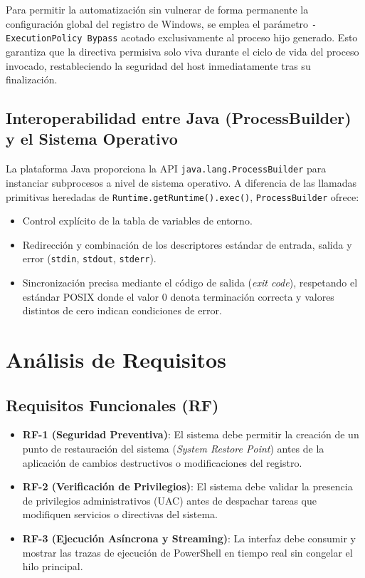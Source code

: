 \documentclass[12pt,a4paper]{report}
\begin{document}
Para permitir la automatización sin vulnerar de forma permanente la configuración global del registro de Windows, se emplea el parámetro \texttt{-ExecutionPolicy Bypass} acotado exclusivamente al proceso hijo generado. Esto garantiza que la directiva permisiva solo viva durante el ciclo de vida del proceso invocado, restableciendo la seguridad del host inmediatamente tras su finalización.

\section{Interoperabilidad entre Java (ProcessBuilder) y el Sistema Operativo}
La plataforma Java proporciona la API \texttt{java.lang.ProcessBuilder} para instanciar subprocesos a nivel de sistema operativo. A diferencia de las llamadas primitivas heredadas de \texttt{Runtime.getRuntime().exec()}, \texttt{ProcessBuilder} ofrece:
\begin{itemize}
    \item Control explícito de la tabla de variables de entorno.
    \item Redirección y combinación de los descriptores estándar de entrada, salida y error (\texttt{stdin}, \texttt{stdout}, \texttt{stderr}).
    \item Sincronización precisa mediante el código de salida (\textit{exit code}), respetando el estándar POSIX donde el valor $0$ denota terminación correcta y valores distintos de cero indican condiciones de error.
\end{itemize}

\chapter{Análisis de Requisitos}
\section{Requisitos Funcionales (RF)}
\begin{itemize}
    \item \textbf{RF-1 (Seguridad Preventiva)}: El sistema debe permitir la creación de un punto de restauración del sistema (\textit{System Restore Point}) antes de la aplicación de cambios destructivos o modificaciones del registro.
    \item \textbf{RF-2 (Verificación de Privilegios)}: El sistema debe validar la presencia de privilegios administrativos (UAC) antes de despachar tareas que modifiquen servicios o directivas del sistema.
    \item \textbf{RF-3 (Ejecución Asíncrona y Streaming)}: La interfaz debe consumir y mostrar las trazas de ejecución de PowerShell en tiempo real sin congelar el hilo principal.
\end{itemize}
\end{document}
